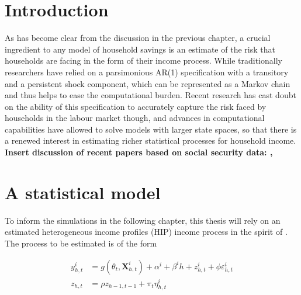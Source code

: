 \section{Introduction}
As has become clear from the discussion in the previous chapter, a crucial 
ingredient to any model of household savings is an estimate of the risk that
households are facing in the form of their income process. While traditionally
researchers have relied on a parsimonious AR(1) specification with a transitory
and a persistent shock component, which can be represented as a Markov chain 
and thus helps to ease the computational burden. Recent research has cast doubt 
on the ability of this specification to accurately capture the risk faced by 
households in the labour market though, and advances in computational 
capabilities have allowed to solve models with larger state spaces, so that 
there is a renewed interest in estimating richer statistical processes for 
household income. \vspace{1cm}
\\
\textbf{Insert discussion of recent papers based on social security data:
\citet{GKOS2015}, \citet{DHPRV2013}}

\section{A statistical model}
To inform the simulations in the following chapter, this thesis will rely on an
estimated heterogeneous income profiles (HIP) income process in the spirit of
\citet{Guvenen2009}. The process to be estimated is of the form

\begin{align}
y_{h,t}^i &= g(\theta_t, \pmb{X}_{h,t}^i) + \alpha^i + \beta^i h + z_{h,t}^i + \phi \varepsilon_{h,t}^i \label{incproc} \\ 
z_{h,t} &= \rho z_{h-1,t-1} + \pi_t \eta_{h,t}^i \label{persshock}
\end{align}

